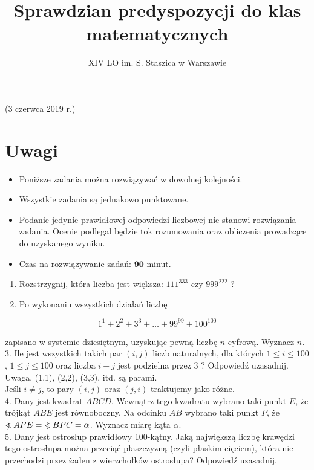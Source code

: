 \documentclass[10pt]{article}
\title{Sprawdzian predyspozycji do klas matematycznych }
\author{XIV LO im. S. Staszica w Warszawie}
\date{}
\newcommand\Varangle{\mathop{{<\!\!\!\!\!\text{\small)}}\:}\nolimits}
\begin{document}
\maketitle
(3 czerwca 2019 r.)

\section*{Uwagi}
\begin{itemize}
  \item Poniższe zadania można rozwiązywać w dowolnej kolejności.
  \item Wszystkie zadania są jednakowo punktowane.
  \item Podanie jedynie prawidłowej odpowiedzi liczbowej nie stanowi rozwiązania zadania. Ocenie podlegal będzie tok rozumowania oraz obliczenia prowadzące do uzyskanego wyniku.
  \item Czas na rozwiązywanie zadań: \(\mathbf{9 0}\) minut.
\end{itemize}

\begin{enumerate}
  \item Rozstrzygnij, która liczba jest większa: \(111^{333}\) czy \(999^{222}\) ?
  \item Po wykonaniu wszystkich działań liczbę
\end{enumerate}

\[
1^{1}+2^{2}+3^{3}+\ldots+99^{99}+100^{100}
\]

zapisano w systemie dziesiętnym, uzyskując pewną liczbę \(n\)-cyfrową. Wyznacz \(n\).\\
3. Ile jest wszystkich takich par \((i, j)\) liczb naturalnych, dla których \(1 \leqslant i \leqslant 100\), \(1 \leqslant j \leqslant 100\) oraz liczba \(i+j\) jest podzielna przez 3 ? Odpowiedź uzasadnij. Uwaga. (1,1), (2,2), (3,3), itd. są parami.\\
Jeśli \(i \neq j\), to pary \((i, j)\) oraz \((j, i)\) traktujemy jako różne.\\
4. Dany jest kwadrat \(A B C D\). Wewnątrz tego kwadratu wybrano taki punkt \(E\), że trójkąt \(A B E\) jest równoboczny. Na odcinku \(A B\) wybrano taki punkt \(P\), że \(\Varangle A P E=\Varangle B P C=\alpha\). Wyznacz miarę kąta \(\alpha\).\\
5. Dany jest ostrosłup prawidłowy 100-kątny. Jaką największą liczbę krawędzi tego ostrosłupa można przeciąć płaszczyzną (czyli płaskim cięciem), która nie przechodzi przez żaden z wierzchołków ostrosłupa? Odpowiedź uzasadnij.
\end{document}
